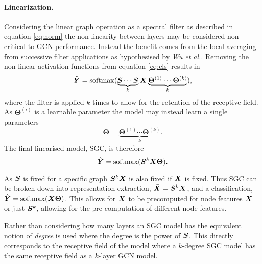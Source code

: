 \paragraph{Linearization.}
Considering the linear graph operation as a spectral filter as described in equation \ref{eq:norm} the non-linearity between layers may be considered non-critical to GCN performance.
Instead the benefit comes from the local averaging from successive filter applications as hypothesised by \textit{Wu et al.}.
Removing the non-linear activation functions from equation \ref{eq:cls} results in
\begin{equation}
    \hat{{\bm{Y}}} = \operatorname{softmax}(\underbrace{{\bm{S}}\cdots{\bm{S}}}_k{\bm{X}}\underbrace{\bm{\Theta}^{(1)}\cdots\bm{\Theta}^{(k)}}_k),
\end{equation}
where the filter is applied $k$ times to allow for the retention of the receptive field.
As $\bm{\Theta}^{(i)}$ is a learnable parameter the model may instead learn a single parameters
\begin{equation}
    \label{eq:theta}
    \bm{\Theta} = \underbrace{\bm{\Theta}^{(1)}\cdots\bm{\Theta}^{(k)}}_k.
\end{equation}
The final linearised model, SGC, is therefore
\begin{equation}
    \label{eq:SGC}
    \hat{{\bm{Y}}} = \operatorname{softmax}({\bm{S}}^{k}{\bm{X}}\bm{\Theta}).
\end{equation}

As ${\bm{S}}$ is fixed for a specific graph ${\bm{S}}^k{\bm{X}}$ is also fixed if ${\bm{X}}$ is fixed.
Thus SGC can be broken down into representation extraction, $\bar{{\bm{X}}} = {\bm{S}}^k{\bm{X}}$, and a classification, $\hat{{\bm{Y}}} = \operatorname{softmax}(\bar{{\bm{X}}}\bm{\Theta})$.
This allows for $\bar{{\bm{X}}}$ to be precomputed for node features ${\bm{X}}$ or just ${\bm{S}}^k$, allowing for the pre-computation of different node features.

Rather than considering how many layers an SGC model has the equivalent notion of \emph{degree} is used where the degree is the power of ${\bm{S}}$.
This directly corresponds to the receptive field of the model where a $k$-degree SGC model has the same receptive field as a $k$-layer GCN model.

